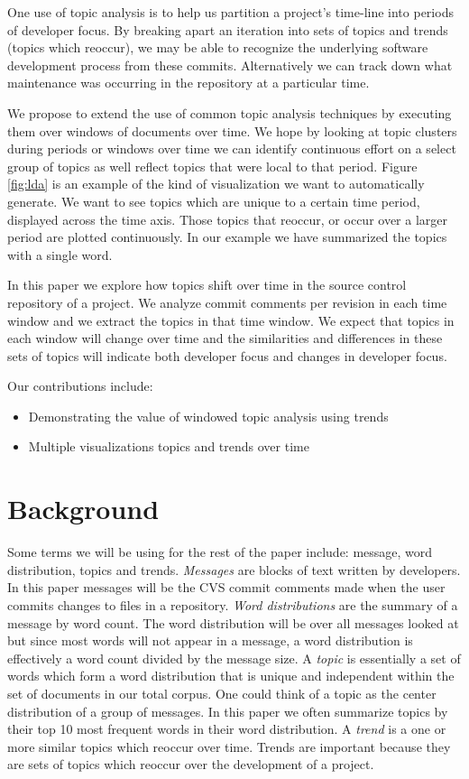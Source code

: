 \documentclass[times, 10pt,twocolumn]{article}
\begin{document}
One use of topic analysis is to help us partition a project's
time-line into periods of developer focus. By breaking apart an
iteration into sets of topics and trends (topics which reoccur), we
may be able to recognize the underlying software development process
from these commits. Alternatively we can track down what maintenance was
occurring in the repository at a particular time.

We propose to extend the use of common topic analysis techniques by
executing them over windows of documents over time. We hope by looking
at topic clusters during periods or windows over time we can identify
continuous effort on a select group of topics as well reflect topics
that were local to that period. Figure \ref{fig:lda} is an example of
the kind of visualization we want to automatically generate. We want
to see topics which are unique to a certain time period, displayed
across the time axis. Those topics that reoccur, or occur over a
larger period are plotted continuously. In our example we have
summarized the topics with a single word.

In this paper we explore how topics shift over time in the
source control repository of a project. We analyze commit comments per
revision in each time window and we extract the topics in that time
window. We expect that topics in each window will change over time and
the similarities and differences in these sets of topics will indicate
both developer focus and changes in developer focus.

Our contributions include:
\begin{itemize}
\item Demonstrating the value of windowed topic analysis using trends
\item Multiple visualizations topics and trends over time
\end{itemize}


\section{Background}


Some terms we will be using for the rest of the paper include:
message, word distribution, topics and trends. \emph{Messages} are
blocks of text written by developers. In this paper messages will be
the CVS commit comments made when the user commits changes to files in
a repository. \emph{Word distributions} are the summary of a message
by word count. The word distribution will be over all messages looked
at but since most words will not appear in a message, a word
distribution is effectively a word count divided by the message
size. A \emph{topic} is essentially a set of words which form a word
distribution that is unique and independent within the set of
documents in our total corpus. One could think of a topic as the
center distribution of a group of messages. In this paper we often
summarize topics by their top 10 most frequent words in their word
distribution.  A \emph{trend} is a one or more similar topics which
reoccur over time. Trends are important because they are sets of
topics which reoccur over the development of a project.
\end{document}
